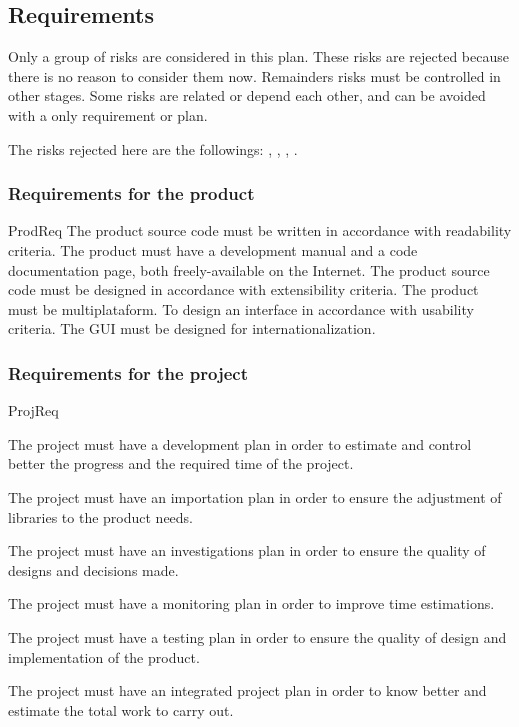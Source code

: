 \documentclass[twocolumn]{article}
\begin{document}
\subsection{Requirements}
Only a group of risks are considered in this plan. These risks are
rejected because there is no reason to consider them now. Remainders
risks must be controlled in other stages. Some risks are related or
depend each other, and can be avoided with a only requirement or
plan.

The risks rejected here are the followings: ,
, , .

\subsubsection{Requirements for the product}
\label{sssec:prodreq}

\begin{labeledpars}{ProdReq}
   The product source code must be
  written in accordance with readability criteria. The product must
  have a development manual and a code documentation page, both
  freely-available on the Internet.
   The product source code must be designed in
  accordance with extensibility criteria. The product must be
  multiplataform.
   To design an interface in accordance with
  usability criteria. The GUI must be designed for
  internationalization.
\end{labeledpars}

\subsubsection{Requirements for the project}
\begin{labeledpars}{ProjReq}

   The project must have a development
  plan in order to estimate and control better the progress and the
  required time of the project.

   The project must have an importation
  plan in order to ensure the adjustment of libraries to the product
  needs.

   The project must have an
  investigations plan in order to ensure the quality of designs and
  decisions made.

   The project must have a monitoring plan
  in order to improve time estimations.

   The project must have a testing plan
  in order to ensure the quality of design and implementation of the
  product.

   The project must have an integrated
  project plan in order to know better and estimate the total work to
  carry out.
\end{labeledpars}
\end{document}

